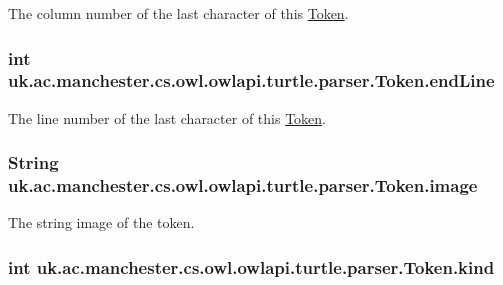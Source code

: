 The column number of the last character of this \hyperlink{classuk_1_1ac_1_1manchester_1_1cs_1_1owl_1_1owlapi_1_1turtle_1_1parser_1_1_token}{Token}. \hypertarget{classuk_1_1ac_1_1manchester_1_1cs_1_1owl_1_1owlapi_1_1turtle_1_1parser_1_1_token_a82fc235f4468a3b6588147e8955f7241}{
\subsubsection[{end\-Line}]{\setlength{\rightskip}{0pt plus 5cm}int uk.\-ac.\-manchester.\-cs.\-owl.\-owlapi.\-turtle.\-parser.\-Token.\-end\-Line}}\label{classuk_1_1ac_1_1manchester_1_1cs_1_1owl_1_1owlapi_1_1turtle_1_1parser_1_1_token_a82fc235f4468a3b6588147e8955f7241}
The line number of the last character of this \hyperlink{classuk_1_1ac_1_1manchester_1_1cs_1_1owl_1_1owlapi_1_1turtle_1_1parser_1_1_token}{Token}. \hypertarget{classuk_1_1ac_1_1manchester_1_1cs_1_1owl_1_1owlapi_1_1turtle_1_1parser_1_1_token_a25ac3290c1591ce7f1c7c01519cf3802}{
\subsubsection[{image}]{\setlength{\rightskip}{0pt plus 5cm}String uk.\-ac.\-manchester.\-cs.\-owl.\-owlapi.\-turtle.\-parser.\-Token.\-image}}\label{classuk_1_1ac_1_1manchester_1_1cs_1_1owl_1_1owlapi_1_1turtle_1_1parser_1_1_token_a25ac3290c1591ce7f1c7c01519cf3802}
The string image of the token. \hypertarget{classuk_1_1ac_1_1manchester_1_1cs_1_1owl_1_1owlapi_1_1turtle_1_1parser_1_1_token_a182c3d2a55ba805842defbe46bc2158c}{
\subsubsection[{kind}]{\setlength{\rightskip}{0pt plus 5cm}int uk.\-ac.\-manchester.\-cs.\-owl.\-owlapi.\-turtle.\-parser.\-Token.\-kind}}\label{classuk_1_1ac_1_1manchester_1_1cs_1_1owl_1_1owlapi_1_1turtle_1_1parser_1_1_token_a182c3d2a55ba805842defbe46bc2158c}
